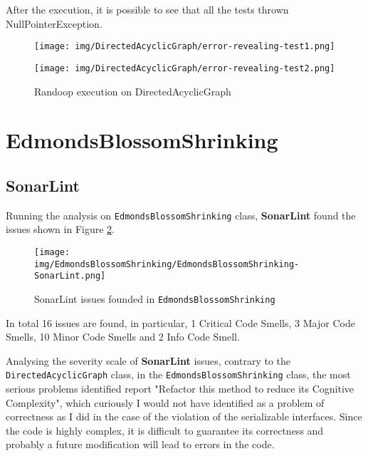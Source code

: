 \documentclass[a4paper,12pt]{article} %
\begin{document}
After the execution, it is possible to see that all the tests thrown NullPointerException.
\begin{figure}[H]
	\centering
	\begin{minipage}[b]{.9\textwidth}
		\texttt{[image: img/DirectedAcyclicGraph/error-revealing-test1.png]}	
	\end{minipage}
	\begin{minipage}[b]{.9\textwidth}
		\texttt{[image: img/DirectedAcyclicGraph/error-revealing-test2.png]}	
	\end{minipage}
\caption{Randoop execution on DirectedAcyclicGraph}
\label{fig:randtest2-graph}
\end{figure}



	\section{EdmondsBlossomShrinking}
	
	\subsection*{SonarLint}
	Running the analysis on \texttt{EdmondsBlossomShrinking} class, \textbf{SonarLint} found the issues shown in Figure \ref{fig:sonar-ed}.
	
	\begin{figure}[H]
		\centering
		\texttt{[image: img/EdmondsBlossomShrinking/EdmondsBlossomShrinking-SonarLint.png]}	
		\caption{SonarLint issues founded in \texttt{EdmondsBlossomShrinking}}
		\label{fig:sonar-ed}
	\end{figure}
	
	In total 16 issues are found, in particular, 1 Critical Code Smells, 3 Major Code Smells, 10 Minor Code Smells and 2 Info Code Smell.
	
	Analysing  the severity scale of \textbf{SonarLint} issues, contrary to the \texttt{DirectedAcyclicGraph} class, in the \texttt{EdmondsBlossomShrinking} class, the most serious problems identified report "Refactor this method to reduce its Cognitive Complexity", which curiously I would not have identified as a problem of correctness as I did in the case of the violation of the serializable interfaces. 
	Since the code is highly complex, it is difficult to guarantee its correctness and probably a future modification will lead to errors in the code.
	
\end{document}

